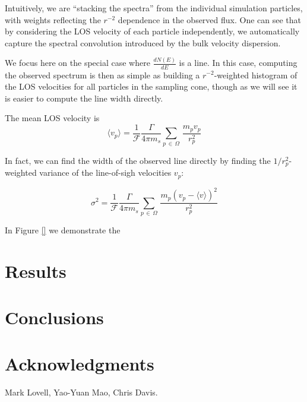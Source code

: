 \documentclass[aps,prl,10pt,twocolumn,superscriptaddress,showpacs]{revtex4-1}
\begin{document}
Intuitively, we are ``stacking the spectra'' from the individual simulation
particles, with weights reflecting the $r^{-2}$ dependence in the observed flux. One can see that by
considering the LOS velocity of each particle independently, we automatically capture the spectral
convolution introduced by the bulk velocity dispersion. 

We focus here on the special case where
$\frac{dN(E)}{dE}$ is a line. In this case, computing the observed spectrum is then as simple as
building a $r^{-2}$-weighted histogram of the LOS velocities for all particles in the sampling cone,
though as we will see it is easier to compute the line width directly.

The mean LOS velocity is
\begin{equation} 
	\langle v_p \rangle =\frac{1}{\mathcal{F}} \frac{\Gamma}{4\pi m_s} \sum_{p \, \in \, \Omega}
	\, \frac{m_p v_p}{r_p^{2}} 
\end{equation}

In fact, we can find the width of the observed line directly by finding the $1/r_p^2$-weighted
variance of the line-of-sigh velocities $v_p$:

\begin{equation} 
	\sigma^2 =\frac{1}{\mathcal{F}} \frac{\Gamma}{4\pi m_s} \sum_{p \, \in \, \Omega}
	\, \frac{m_p (v_p-\langle v\rangle)^2}{r_p^{2}} 
\end{equation}

In Figure \ref{} we demonstrate the 



\section{Results}
\label{sec:results}



\section{Conclusions}
\label{sec:conclusions}

 
\vspace{-0.5 cm}
	

\section*{Acknowledgments} 

Mark Lovell, Yao-Yuan Mao, Chris Davis.


\newcommand{\mnras}[0]{M.N.R.A.S.}

%	
	
\end{document}
